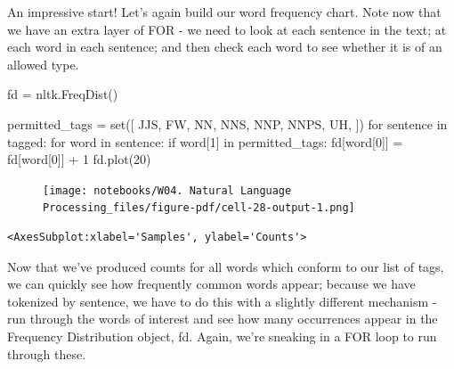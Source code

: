 \documentclass[
  letterpaper,
  DIV=11,
  numbers=noendperiod]{scrreprt}
\newenvironment{Shaded}{\begin{snugshade}}{\end{snugshade}}
\newcommand{\BuiltInTok}[1]{\textcolor[rgb]{0.00,0.23,0.31}{#1}}
\newcommand{\ControlFlowTok}[1]{\textcolor[rgb]{0.00,0.23,0.31}{#1}}
\newcommand{\DecValTok}[1]{\textcolor[rgb]{0.68,0.00,0.00}{#1}}
\newcommand{\KeywordTok}[1]{\textcolor[rgb]{0.00,0.23,0.31}{#1}}
\newcommand{\NormalTok}[1]{\textcolor[rgb]{0.00,0.23,0.31}{#1}}
\newcommand{\OperatorTok}[1]{\textcolor[rgb]{0.37,0.37,0.37}{#1}}
\newcommand{\StringTok}[1]{\textcolor[rgb]{0.13,0.47,0.30}{#1}}
\begin{document}
An impressive start! Let's again build our word frequency chart. Note
now that we have an extra layer of FOR - we need to look at each
sentence in the text; at each word in each sentence; and then check each
word to see whether it is of an allowed type.

\begin{Shaded}
\begin{Highlighting}[]
\NormalTok{fd }\OperatorTok{=}\NormalTok{ nltk.FreqDist()}

\NormalTok{permitted\_tags }\OperatorTok{=} \BuiltInTok{set}\NormalTok{([}
    \StringTok{\textquotesingle{}JJS\textquotesingle{}}\NormalTok{,}
    \StringTok{\textquotesingle{}FW\textquotesingle{}}\NormalTok{,}
    \StringTok{\textquotesingle{}NN\textquotesingle{}}\NormalTok{,}
    \StringTok{\textquotesingle{}NNS\textquotesingle{}}\NormalTok{,}
    \StringTok{\textquotesingle{}NNP\textquotesingle{}}\NormalTok{,}
    \StringTok{\textquotesingle{}NNPS\textquotesingle{}}\NormalTok{,}
    \StringTok{\textquotesingle{}UH\textquotesingle{}}\NormalTok{,}
\NormalTok{])}
\ControlFlowTok{for}\NormalTok{ sentence }\KeywordTok{in}\NormalTok{ tagged:}
    \ControlFlowTok{for}\NormalTok{ word }\KeywordTok{in}\NormalTok{ sentence:}
        \ControlFlowTok{if}\NormalTok{ word[}\DecValTok{1}\NormalTok{] }\KeywordTok{in}\NormalTok{ permitted\_tags:}
\NormalTok{                fd[word[}\DecValTok{0}\NormalTok{]] }\OperatorTok{=}\NormalTok{ fd[word[}\DecValTok{0}\NormalTok{]] }\OperatorTok{+} \DecValTok{1}
\NormalTok{fd.plot(}\DecValTok{20}\NormalTok{)}
\end{Highlighting}
\end{Shaded}

\begin{figure}[H]

{\centering \texttt{[image: notebooks/W04. Natural Language Processing\_files/figure-pdf/cell-28-output-1.png]}

}

\end{figure}

\begin{verbatim}
<AxesSubplot:xlabel='Samples', ylabel='Counts'>
\end{verbatim}

Now that we've produced counts for all words which conform to our list
of tags, we can quickly see how frequently common words appear; because
we have tokenized by sentence, we have to do this with a slightly
different mechanism - run through the words of interest and see how many
occurrences appear in the Frequency Distribution object, fd. Again,
we're sneaking in a FOR loop to run through these.
\end{document}
